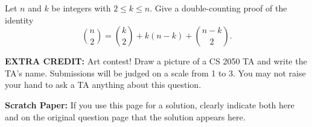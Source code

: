 \documentclass[11pt,addpoints]{exam}
\begin{document}
\begin{questions}
\newpage
\question[15] Let $n$ and $k$ be integers with $2\le k\le n$. Give a double-counting proof of the identity
\[
\binom{n}{2}=\binom{k}{2}+k(n-k)+\binom{n-k}{2}.
\]

\newpage
\question \textbf{EXTRA CREDIT:} Art contest! Draw a picture of a CS 2050 TA and write the TA's name. Submissions will be judged on a scale from 1 to 3. You may not raise your hand to ask a TA anything about this question.

\newpage
\textbf{Scratch Paper:} If you use this page for a solution, clearly indicate both here and on the original question page that the solution appears here.

\end{questions}
\end{document}
